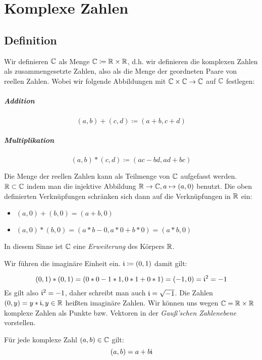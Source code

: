 \chapter{Komplexe Zahlen}
\section{Definition}
Wir definieren $\mathbb{C}$ als Menge $\mathbb{C}\coloneqq\mathbb{R}\times\mathbb{R}$, d.h. wir definieren die komplexen Zahlen als zusammengesetzte Zahlen, also als die Menge der geordneten Paare von reellen Zahlen.
Wobei wir folgende Abbildungen mit $\mathbb{C}\times\mathbb{C}\rightarrow\mathbb{C}$ auf $\mathbb{C}$ festlegen:
\paragraph{Addition}
\begin{equation*}
  (a,b) + (c,d) \coloneqq (a+b,c+d)
\end{equation*}
\paragraph{Multiplikation}
\begin{equation*}
  (a,b) * (c,d) \coloneqq (ac-bd,ad+bc)
\end{equation*}

\bemerkung
Die Menge der reellen Zahlen kann als Teilmenge von $\mathbb{C}$ aufgefasst werden. $\mathbb{R}\subset\mathbb{C}$ indem man die injektive Abbildung $\mathbb{R}\rightarrow\mathbb{C}, a\mapsto (a,0)$ benutzt. Die oben definierten Verknüpfungen schränken sich dann auf die Verknüpfungen in $\mathbb{R}$ ein:
\begin{itemize}
  \item $(a,0)+(b,0)=(a+b,0)$
  \item $(a,0)*(b,0)=(a* b - 0, a* 0+ b* 0) = (a* b,0)$
\end{itemize}
In diesem Sinne ist $\mathbb{C}$ eine \emph{Erweiterung} des Körpers $\mathbb{R}$.

Wir führen die imaginäre Einheit ein.
$\mathfrak{i}\coloneqq (0,1)$ damit gilt:

\begin{equation*}
  (0,1)*(0,1) = (0*0 -1*1,0*1+0*1)=(-1,0)=\mathfrak{i}^2=-1
\end{equation*}
Es gilt also $\mathfrak{i}^2=-1$, daher schreibt man auch $\mathfrak{i}=\sqrt{-1}$. Die Zahlen $(0,y)=y*\mathfrak{i}, y\in\mathbb{R}$ heißten imaginäre Zahlen.
Wir können uns wegen $\mathbb{C}=\mathbb{R}\times\mathbb{R}$ komplexe Zahlen als Punkte bzw. Vektoren in der \emph{Gauß'schen Zahlenebene} vorstellen.

\begin{satz}{}
  Für jede komplexe Zahl $(a,b)\in\mathbb{C}$ gilt:
  \begin{equation*}
    (a,b)=a+b\mathfrak{i}
  \end{equation*}
\end{satz}

